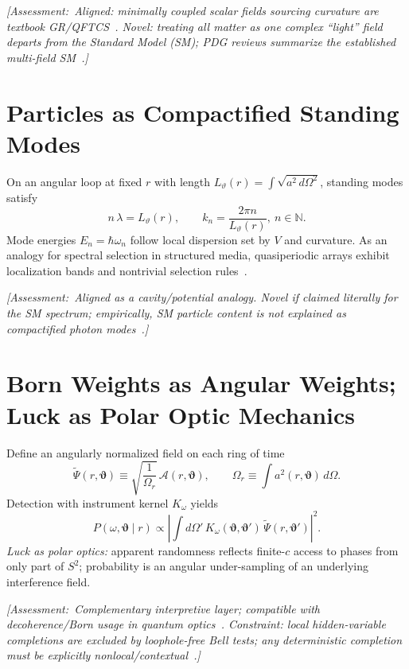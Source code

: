 \documentclass[reprint,amsmath,amssymb,aps,pra]{revtex4-2} %
\newcommand{\A}{\mathcal{A}}                   %
\newcommand{\ang}{\vartheta}                   %
\newcommand{\angb}{\boldsymbol{\vartheta}}     %
\newcommand{\Assessment}[1]{\par\smallskip\noindent\textit{\color{blue}[Assessment:\ #1]}\par\smallskip}
\begin{document}
\Assessment{Aligned: minimally coupled scalar fields sourcing curvature are textbook GR/QFTCS~\cite{BirrellDavies,ParkerToms}. Novel: treating \emph{all} matter as one complex ``light'' field departs from the Standard Model (SM); PDG reviews summarize the established multi-field SM~\cite{PDG2024}.}

\section{Particles as Compactified Standing Modes}
On an angular loop at fixed $r$ with length $L_\ang(r)=\int\sqrt{a^2\,d\Omega^2}$, standing modes satisfy
\begin{equation}
  n\,\lambda = L_\ang(r),\qquad k_n=\frac{2\pi n}{L_\ang(r)},\ n\in\mathbb{N}.
  \label{eq:quantization}
\end{equation}
Mode energies $E_n=\hbar\omega_n$ follow local dispersion set by $V$ and curvature. As an analogy for spectral selection in structured media, quasiperiodic arrays exhibit localization bands and nontrivial selection rules~\cite{WahlstromChao1988}.

\Assessment{Aligned as a cavity/potential analogy. Novel if claimed literally for the SM spectrum; empirically, SM particle content \emph{is not} explained as compactified photon modes~\cite{PDG2024}.}

\section{Born Weights as Angular Weights; Luck as Polar Optic Mechanics}
Define an angularly normalized field on each ring of time
\begin{equation}
  \tilde{\Psi}(r,\angb) \equiv \sqrt{\frac{1}{\Omega_r}}\,\A(r,\angb),\qquad
  \Omega_r\equiv\int a^2(r,\angb)\,d\Omega.
  \label{eq:polar-psi}
\end{equation}
Detection with instrument kernel $K_\omega$ yields
\begin{equation}
  P(\omega,\angb\mid r)\propto\left|\int d\Omega'\,K_\omega(\angb,\angb')\,\tilde{\Psi}(r,\angb')\right|^2.
\end{equation}
\emph{Luck as polar optics:} apparent randomness reflects finite-$c$ access to phases from only part of $S^2$; probability is an angular under-sampling of an underlying interference field.

\Assessment{Complementary interpretive layer; compatible with decoherence/Born usage in quantum optics~\cite{MandelWolf1995}. Constraint: local hidden-variable completions are excluded by loophole-free Bell tests; any deterministic completion must be explicitly nonlocal/contextual~\cite{Hensen2015,Giustina2015,Shalm2015,Bohm1952}.}
\end{document}
